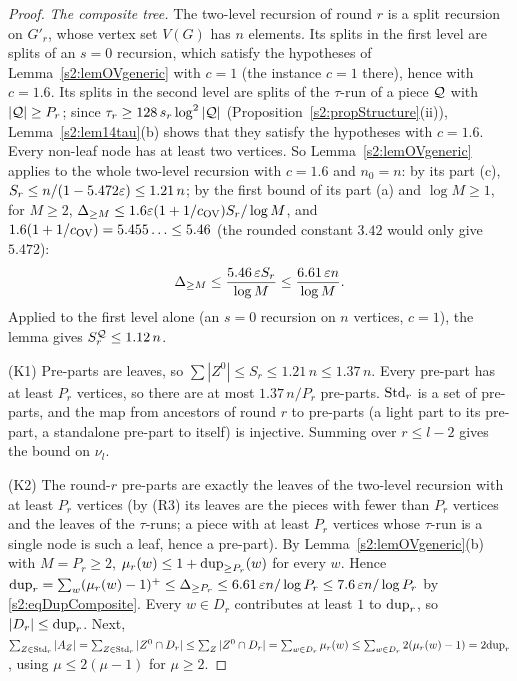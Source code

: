 \begin{proof}
\emph{The composite tree.} The two-level recursion of round $r$ is a split
recursion on $G'_r$, whose vertex set $V(G)$ has $n$ elements. Its splits in the
first level are splits of an $s=0$ recursion, which satisfy the hypotheses of
Lemma~\ref{s2:lemOVgeneric} with $c=1$ (the instance $c=1$ there), hence with
$c=1.6$. Its splits in the second level are splits of the $\tau$-run of a piece
$\mathcal{Q}$ with $|\mathcal{Q}|\ge P_r$; since $\tau_r\ge128\,s_r\log^2|\mathcal{Q}|$
(Proposition~\ref{s2:propStructure}(ii)), Lemma~\ref{s2:lem14tau}(b) shows that
they satisfy the hypotheses with $c=1.6$. Every non-leaf node has at least two
vertices. So Lemma~\ref{s2:lemOVgeneric} applies to the whole two-level
recursion with $c=1.6$ and $n_0=n$: by its part (c),
$S_r\le n/(1-5.472\varepsilon)\le1.21\,n$; by the first bound of its part (a) and
$\log M\ge1$, for $M\ge2$, $\Delta_{\ge M}\le1.6\varepsilon(1+1/c_{\mathrm{OV}})S_r/\log M$, and
$1.6(1+1/c_{\mathrm{OV}})=5.455\ldots\le5.46$ (the rounded constant $3.42$ would only give
$5.472$):
\begin{equation}\label{s2:eqDupComposite}
\Delta_{\ge M}\le\frac{5.46\,\varepsilon S_r}{\log M}\le\frac{6.61\,\varepsilon n}{\log M}.
\end{equation}
Applied to the first level alone (an $s=0$ recursion on $n$ vertices, $c=1$),
the lemma gives $S^{\mathcal{Q}}_r\le1.12\,n$.

(K1) Pre-parts are leaves, so $\sum|Z^0|\le S_r\le1.21\,n\le1.37\,n$. Every
pre-part has at least $P_r$ vertices, so there are at most $1.37\,n/P_r$
pre-parts. $\mathrm{Std}_r$ is a set of pre-parts, and the map from ancestors of round
$r$ to pre-parts (a light part to its pre-part, a standalone pre-part to
itself) is injective. Summing over $r\le l-2$ gives the bound on $\nu_l$.

(K2) The round-$r$ pre-parts are exactly the leaves of the two-level recursion
with at least $P_r$ vertices (by (R3) its leaves are the pieces with fewer than
$P_r$ vertices and the leaves of the $\tau$-runs; a piece with at least $P_r$
vertices whose $\tau$-run is a single node is such a leaf, hence a pre-part). By
Lemma~\ref{s2:lemOVgeneric}(b) with $M=P_r\ge2$, $\mu_r(w)\le1+\mathrm{dup}_{\ge
P_r}(w)$ for every $w$. Hence $\mathrm{dup}_r=\sum_w(\mu_r(w)-1)^+\le\Delta_{\ge P_r}\le
6.61\,\varepsilon n/\log P_r\le7.6\,\varepsilon n/\log P_r$ by \eqref{s2:eqDupComposite}.
Every $w\in D_r$ contributes at least $1$ to $\mathrm{dup}_r$, so $|D_r|\le\mathrm{dup}_r$.
Next, $\sum_{Z\in\mathrm{Std}_r}|A_Z|=\sum_{Z\in\mathrm{Std}_r}|Z^0\cap D_r|\le\sum_Z|Z^0\cap
D_r|=\sum_{w\in D_r}\mu_r(w)\le\sum_{w\in D_r}2(\mu_r(w)-1)=2\mathrm{dup}_r$, using
$\mu\le2(\mu-1)$ for $\mu\ge2$.


\end{proof}
